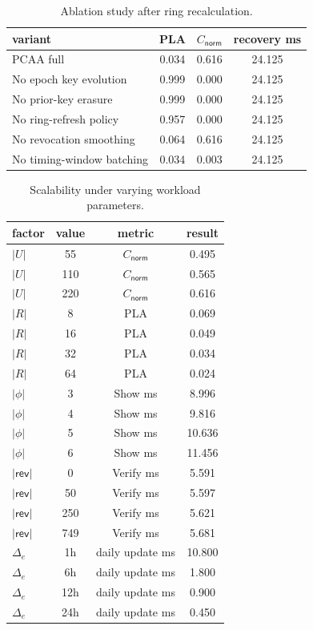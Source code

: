 \begin{table}[t]
\centering
\caption{Ablation study after ring recalculation.}
\label{tab:ablation}
\begin{tabular}{@{}lccc@{}}
\toprule
variant & PLA & $C_{\mathsf{norm}}$ & recovery ms \\
\midrule
PCAA full & 0.034 & 0.616 & 24.125 \\
No epoch key evolution & 0.999 & 0.000 & 24.125 \\
No prior-key erasure & 0.999 & 0.000 & 24.125 \\
No ring-refresh policy & 0.957 & 0.000 & 24.125 \\
No revocation smoothing & 0.064 & 0.616 & 24.125 \\
No timing-window batching & 0.034 & 0.003 & 24.125 \\
\bottomrule
\end{tabular}
\end{table}

\begin{table}[t]
\centering
\caption{Scalability under varying workload parameters.}
\label{tab:scalability}
\begin{tabular}{@{}lccc@{}}
\toprule
factor & value & metric & result \\
\midrule
$|U|$ & 55 & $C_{\mathsf{norm}}$ & 0.495 \\
$|U|$ & 110 & $C_{\mathsf{norm}}$ & 0.565 \\
$|U|$ & 220 & $C_{\mathsf{norm}}$ & 0.616 \\
$|R|$ & 8 & PLA & 0.069 \\
$|R|$ & 16 & PLA & 0.049 \\
$|R|$ & 32 & PLA & 0.034 \\
$|R|$ & 64 & PLA & 0.024 \\
$|\phi|$ & 3 & Show ms & 8.996 \\
$|\phi|$ & 4 & Show ms & 9.816 \\
$|\phi|$ & 5 & Show ms & 10.636 \\
$|\phi|$ & 6 & Show ms & 11.456 \\
$|\mathsf{rev}|$ & 0 & Verify ms & 5.591 \\
$|\mathsf{rev}|$ & 50 & Verify ms & 5.597 \\
$|\mathsf{rev}|$ & 250 & Verify ms & 5.621 \\
$|\mathsf{rev}|$ & 749 & Verify ms & 5.681 \\
$\Delta_e$ & 1h & daily update ms & 10.800 \\
$\Delta_e$ & 6h & daily update ms & 1.800 \\
$\Delta_e$ & 12h & daily update ms & 0.900 \\
$\Delta_e$ & 24h & daily update ms & 0.450 \\
\bottomrule
\end{tabular}
\end{table}